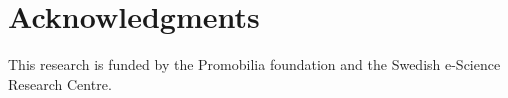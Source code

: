 




%	
%

\section*{Acknowledgments}
This research is funded by the Promobilia foundation and the Swedish
e-Science Research Centre.

{\small
}
